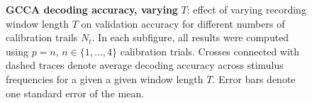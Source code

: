 \begin{figure}[htp]
\hfill
{}

\hfill
{}

\caption[GCCA decoding accuracy, varying $T$: effect of varying recording window length $T$ on validation accuracy for different numbers of calibration trials $p$]{\textbf{GCCA decoding accuracy, varying }$T$: effect of varying recording window length $T$ on validation accuracy for different numbers of calibration trails $N_t$. In each subfigure, all results were computed using $p=n, \, n\in\{1, \dots, 4\}$ calibration trials. Crosses connected with dashed traces denote average decoding accuracy across stimulus frequencies for a given a given window length $T$. Error bars denote one standard error of the mean.}
\label{fig:gcca-acc-ns}
\end{figure}

